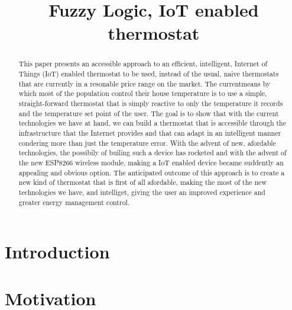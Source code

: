 \documentclass[conference]{IEEEtran}
\begin{document}
\title{Fuzzy Logic, IoT enabled thermostat}


\author{
}

\maketitle


\begin{abstract}

This paper presents an accessible approach to an efficient, intelligent, Internet of Things (IoT) enabled
thermostat to be used, instead of the usual, naive thermostats that are currently in a resonable price range
on the market. The currentmeans by which most of the population control their house temperature is to use a
simple, straight-forward thermostat that is simply reactive to only the temperature it records and the
temperature set point of the user. The goal is to show that with the current technologies we have at hand,
we can build a thermostat that is accessible through the infrastructure that the Internet provides and that
can adapt in an intelligent manner condering more than just the temperature error. With the advent of new,
afordable technologies, the possibily of builing such a device has rocketed and with the advent of the new
ESP8266 wireless module, making a IoT enabled device became suddently an appealing and obvious option. The
anticipated outcome of this approach is to create a new kind of thermostat that is first of all afordable,
making the most of the new technologies we have, and intelliget, giving the user an improved experience and
greater energy management control.

\end{abstract}


\section{Introduction}
\label{Introduction}



\section{Motivation}
\label{Motivation}
\end{document}
